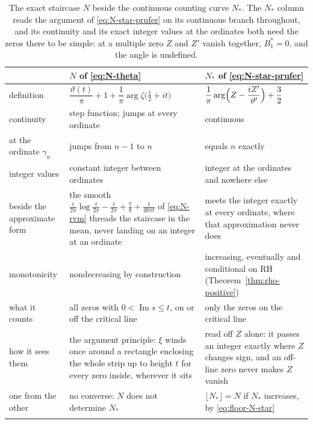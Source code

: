 \documentclass[11pt]{article}
\theoremstyle{definition}
\begin{document}
\begin{table}[H]
\centering
\small
\begin{tabular}{@{}p{}p{}p{}@{}}
\toprule
 & $N$ of \eqref{eq:N-theta} & $N_{\ast}$ of \eqref{eq:N-star-prufer} \\
\midrule
definition &
$\dfrac{\vartheta(t)}{\pi}+1+\dfrac{1}{\pi}\arg\zeta\bigl(\tfrac12+it\bigr)$ &
$\dfrac{1}{\pi}\arg\Bigl(Z-\dfrac{iZ'}{\vartheta'}\Bigr)+\dfrac32$ \\[4pt]
\arrayrulecolor{black!20}\midrule
continuity & step function; jumps at every ordinate & continuous \\
\midrule
at the ordinate $\gamma_n$ & jumps from $n-1$ to $n$ & equals $n$ exactly \\
\midrule
integer values & constant integer between ordinates & integer at the
ordinates and nowhere else \\
\midrule
beside the approximate form & the smooth
$\frac{t}{2\pi}\log\frac{t}{2\pi}-\frac{t}{2\pi}+\frac78+\frac{1}{48\pi t}$
of \eqref{eq:N-rvm} threads the staircase in the mean, never landing on an
integer at an ordinate &
meets the integer exactly at every ordinate, where that approximation never
does \\
\midrule
monotonicity & nondecreasing by construction & increasing, eventually and
conditional on RH (Theorem~\ref{thm:rho-positive}) \\
\midrule
what it counts & all zeros with $0<\operatorname{Im}s\leq t$, on or off the
critical line & only the zeros on the critical line \\
\midrule
how it sees them & the argument principle: $\xi$ winds once around a
rectangle enclosing the whole strip up to height $t$ for every zero inside,
wherever it sits & read off $Z$ alone: it passes an integer exactly where
$Z$ changes sign, and an off-line zero never makes $Z$ vanish \\
\midrule
one from the other & no converse: $N$ does not determine $N_{\ast}$ &
$\lfloor N_{\ast}\rfloor=N$ if $N_{\ast}$
increases, by \eqref{eq:floor-N-star} \\
\arrayrulecolor{black}\bottomrule
\end{tabular}
\caption{The exact staircase $N$ beside the continuous counting curve
$N_{\ast}$. The $N_{\ast}$ column reads the argument of
\eqref{eq:N-star-prufer} on its continuous branch throughout, and its
continuity and its exact integer values at the ordinates both need the zeros
there to be simple: at a multiple zero $Z$ and $Z'$ vanish together,
$B_1^{\ast}=0$, and the angle is undefined.}
\label{tab:N-vs-Nstar}
\end{table}
\end{document}
